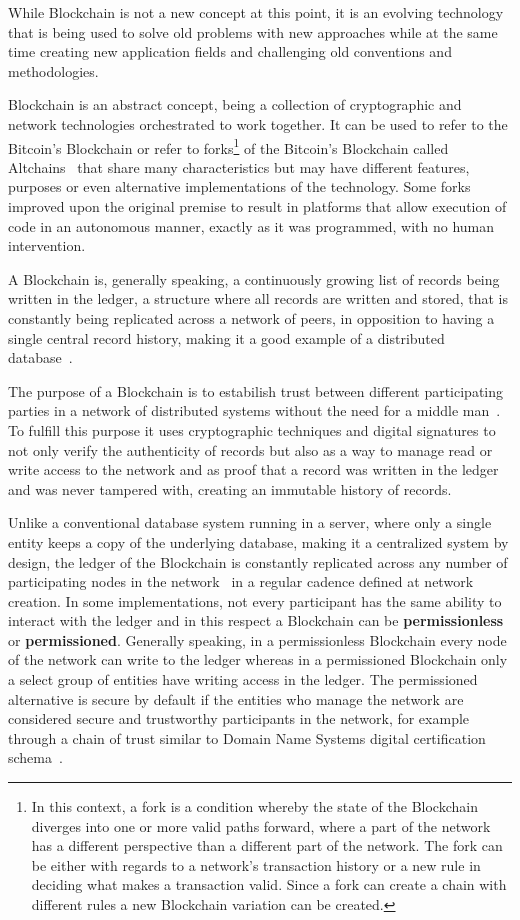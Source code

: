 While Blockchain is not a new concept at this point, it is an evolving
technology that is being used to solve old problems with new approaches while
at the same time creating new application fields and challenging old
conventions and methodologies.

Blockchain is an abstract concept, being a collection of cryptographic and
network technologies orchestrated to work together. It can be used to refer to
the Bitcoin's Blockchain or refer to forks\footnote{In this context, a fork is
a condition whereby the state of the Blockchain diverges into one or more valid
paths forward, where a part of the network has a different perspective than a
different part of the network. The fork can be either with regards to a
network's transaction history or a new rule in deciding what makes a
transaction valid. Since a fork can create a chain with different rules a new
Blockchain variation can be created.} of the Bitcoin's Blockchain called
Altchains~\cite{Lewis2015} that share many characteristics but may have
different features, purposes or even alternative implementations of the
technology. Some forks improved upon the original premise to result in
platforms that allow execution of code in an autonomous manner, exactly as it
was programmed, with no human intervention.

A Blockchain is, generally speaking, a continuously growing list of records
being written in the ledger, a structure where all records are written and
stored, that is constantly being replicated across a network of peers, in
opposition to having a single central record history, making it a good example
of a distributed database~\cite{Barclay2017}.

The purpose of a Blockchain is to estabilish trust between different
participating parties in a network of distributed systems without the need for
a middle man~\cite{Drescher2017}. To fulfill this purpose it uses cryptographic
techniques and digital signatures to not only verify the authenticity of
records but also as a way to manage read or write access to the network and as
proof that a record was written in the ledger and was never tampered with,
creating an immutable history of records.

Unlike a conventional database system running in a server, where only a single
entity keeps a copy of the underlying database, making it a centralized system
by design, the ledger of the Blockchain is constantly replicated across any
number of participating nodes in the network~\cite{Lewis2015} in a regular
cadence defined at network creation. In some implementations, not every
participant has the same ability to interact with the ledger and in this
respect a Blockchain can be \textbf{permissionless} or \textbf{permissioned}.
Generally speaking, in a permissionless Blockchain every node of the network
can write to the ledger whereas in a permissioned Blockchain only a select
group of entities have writing access in the ledger. The permissioned
alternative is secure by default if the entities who manage the network are
considered secure and trustworthy participants in the network, for example
through a chain of trust similar to Domain Name Systems digital certification
schema~\cite{Lewis2015,Valenta2017}.

